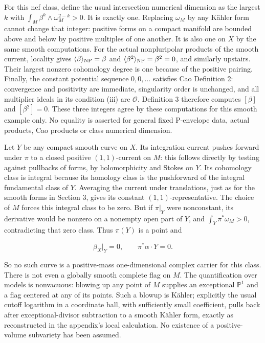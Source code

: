 \documentclass[11pt]{article}
\begin{document}
For this nef class, define the usual intersection numerical dimension as the largest $k$ with $\int_M\beta^k\wedge\omega_M^{2-k}>0$. It is exactly one. Replacing $\omega_M$ by any Kähler form cannot change that integer: positive forms on a compact manifold are bounded above and below by positive multiples of one another. It is also one on $X$ by the same smooth computations. For the actual nonpluripolar products of the smooth current, locality gives $\langle\beta\rangle_{\rm NP}=\beta$ and $\langle\beta^2\rangle_{\rm NP}=\beta^2=0$, and similarly upstairs. Their largest nonzero cohomology degree is one because of the positive pairing. Finally, the constant potential sequence $0,0,\ldots$ satisfies Cao Definition 2: convergence and positivity are immediate, singularity order is unchanged, and all multiplier ideals in its condition (iii) are $\mathcal O$. Definition 3 therefore computes $[\beta]$ and $[\beta^2]=0$. These three integers agree by these computations for this smooth example only. No equality is asserted for general fixed P-\allowbreak{}envelope data, actual products, Cao products or class numerical dimension.

Let $Y$ be any compact smooth curve on $X$. Its integration current pushes forward under $\pi$ to a closed positive $(1,1)$-\allowbreak{}current on $M$: this follows directly by testing against pullbacks of forms, by holomorphicity and Stokes on $Y$. Its cohomology class is integral because its homology class is the pushforward of the integral fundamental class of $Y$. Averaging the current under translations, just as for the smooth forms in Section 3, gives its constant $(1,1)$-\allowbreak{}representative. The choice of $M$ forces this integral class to be zero. But if $\pi|_Y$ were nonconstant, its derivative would be nonzero on a nonempty open part of $Y$, and $\int_Y\pi^*\omega_M>0$, contradicting that zero class. Thus $\pi(Y)$ is a point and

\[\beta_X|_Y=0,\qquad \pi^*\alpha\cdot Y=0.\]

So no such curve is a positive-\allowbreak{}mass one-\allowbreak{}dimensional complex carrier for this class. There is not even a globally smooth complete flag on $M$. The quantification over models is nonvacuous: blowing up any point of $M$ supplies an exceptional $\mathbb P^1$ and a flag centered at any of its points. Such a blowup is Kähler; explicitly the usual cutoff logarithm in a coordinate ball, with sufficiently small coefficient, pulls back after exceptional-\allowbreak{}divisor subtraction to a smooth Kähler form, exactly as reconstructed in the appendix's local calculation. No existence of a positive-\allowbreak{}volume subvariety has been assumed.
\end{document}
